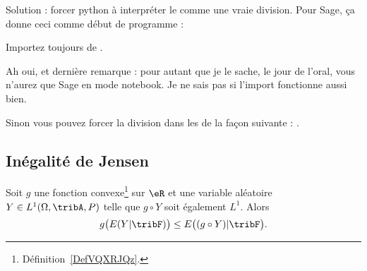 Solution : forcer python à interpréter le \info{/} comme une vraie division. Pour Sage, ça donne ceci comme début de programme :



Importez toujours  de .

Ah oui, et dernière remarque : pour autant que je le sache, le jour de l'oral, vous n'aurez que Sage en mode notebook. Je ne sais pas si l'import fonctionne aussi bien.

Sinon vous pouvez forcer la division dans les  de la façon suivante : .

\subsection{Inégalité de Jensen}

\begin{proposition}    \label{PropABtKbBo}
    Soit \( g\) une fonction convexe\footnote{Définition~\ref{DefVQXRJQz}.} sur \( \eR\) et une variable aléatoire \( Y\in L^1(\Omega,\tribA,P)\) telle que \( g\circ Y\) soit également \( L^1\). Alors
    \begin{equation}
        g\big( E(Y|\tribF) \big)\leq E\big( (g\circ Y)|\tribF \big).
    \end{equation}
\end{proposition}

